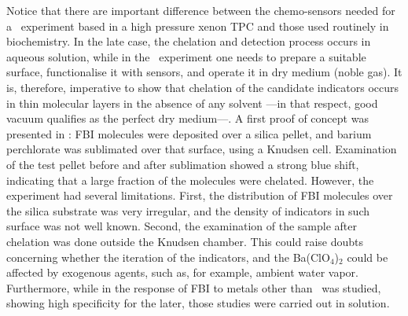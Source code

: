 \documentclass[aps,prl,reprint,longbibliography,superscriptaddress, english]{revtex4-1}
\begin{document}
Notice that there are important difference between the chemo-sensors needed for a \bbonu\ experiment based in a high pressure xenon TPC and those used routinely in biochemistry. In the late case, the chelation and detection process occurs in aqueous solution, while in the \bbonu\ experiment one needs to prepare a suitable surface, functionalise it with sensors, and operate it in dry medium (noble gas). It is, therefore, imperative to show that chelation of the candidate indicators occurs in thin molecular layers in the absence of any solvent ---in that respect, good vacuum qualifies as the perfect dry medium---. A first proof of concept was presented in \cite{rivilla_fluorescent_2020}: FBI molecules were deposited over a silica pellet, and barium perchlorate was sublimated over that surface, using a Knudsen cell. Examination of the test pellet before and after sublimation showed a strong blue shift, indicating that a large fraction of the molecules were chelated. However, the experiment had several limitations. First, the distribution of FBI molecules over the silica substrate was very irregular, and the density of indicators in such surface was not well known. Second, the examination of the sample after chelation was done outside the Knudsen chamber. This could raise doubts concerning whether the iteration of the indicators, and the Ba(ClO$_4$)$_2$ could be affected by exogenous agents, such as, for example, ambient water vapor. Furthermore, while in the response of FBI to metals other than \Bapp\ was studied, showing high specificity for the later, those studies were carried out in solution. 


 
\end{document}
